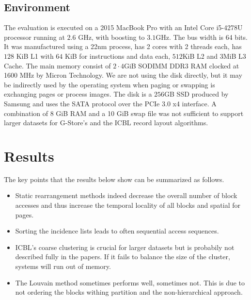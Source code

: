     \subsection*{Environment}
        The evaluation is executed on a 2015 MacBook Pro with an Intel Core i5-4278U processor running at $2.6$ GHz, with boosting to $3.1$GHz. The bus width is 64 bits. 
        It was manufactured using a 22nm process, has 2 cores with 2 threads each, has $128$ KiB L1 with $64$ KiB for instructions and data each, $512$KiB L2 and 3MiB L3 Cache.
        The main memory consist of $2 \cdot 4$GiB SODIMM DDR3 RAM clocked at 1600 MHz by Micron Technology.
        We are not using the disk directly, but it may be indirectly used by the operating system when paging or swapping is exchanging pages or process images.
        The disk is a $256$GB SSD produced by Samsung and uses the SATA protocol over the PCIe 3.0 x4 interface. A combination of 8 GiB RAM and a 10 GiB swap file was not sufficient to support larger datasets for G-Store's and the ICBL record layout algorithms.
    
\section{Results}\label{\positionnumber}
    The key points that the results below show can be summarized as follows.
    \begin{itemize}
     \item Static rearrangement methods indeed decrease the overall number of block accesses and thus increase the temporal locality of all blocks and spatial for pages.
     \item Sorting the incidence lists leads to often sequential access sequences.
     \item ICBL's coarse clustering is crucial for larger datasets but is probabily not described fully in the papers.
     If it fails to balance the size of the cluster, systems will run out of memory.
     \item The Louvain method sometimes performs well, sometimes not. This is due to not ordering the blocks withing partition and the non-hierarchical approach.
    \end{itemize}
    
